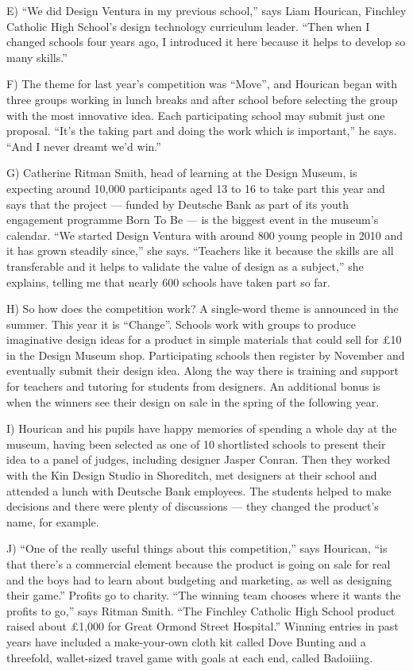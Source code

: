 \documentclass[UTF8,11pt]{ctexart}
\begin{document}
E) “We did Design Ventura in my previous school,” says Liam Hourican, Finchley Catholic High School’s design technology curriculum leader. “Then when I changed schools four years ago, I introduced it here because it helps to develop so many skills.”


F) The theme for last year’s competition was “Move”, and Hourican began with three groups working in lunch breaks and after school before selecting the group with the most innovative idea. Each participating school may submit just one proposal. “It’s the taking part and doing the work which is important,” he says. “And I never dreamt we’d win.”


G) Catherine Ritman Smith, head of learning at the Design Museum, is expecting around 10,000 participants aged 13 to 16 to take part this year and says that the project — funded by Deutsche Bank as part of its youth engagement programme Born To Be — is the biggest event in the museum’s calendar. “We started Design Ventura with around 800 young people in 2010 and it has grown steadily since,” she says. “Teachers like it because the skills are all transferable and it helps to validate the value of design as a subject,” she explains, telling me that nearly 600 schools have taken part so far.


H) So how does the competition work? A single-word theme is announced in the summer. This year it is “Change”. Schools work with groups to produce imaginative design ideas for a product in simple materials that could sell for £10 in the Design Museum shop. Participating schools then register by November and eventually submit their design idea. Along the way there is training and support for teachers and tutoring for students from designers. An additional bonus is when the winners see their design on sale in the spring of the following year.


I) Hourican and his pupils have happy memories of spending a whole day at the museum, having been selected as one of 10 shortlisted schools to present their idea to a panel of judges, including designer Jasper Conran. Then they worked with the Kin Design Studio in Shoreditch, met designers at their school and attended a lunch with Deutsche Bank employees. The students helped to make decisions and there were plenty of discussions — they changed the product’s name, for example.


J) “One of the really useful things about this competition,” says Hourican, “is that there’s a commercial element because the product is going on sale for real and the boys had to learn about budgeting and marketing, as well as designing their game.” Profits go to charity. “The winning team chooses where it wants the profits to go,” says Ritman Smith. “The Finchley Catholic High School product raised about £1,000 for Great Ormond Street Hospital.” Winning entries in past years have included a make-your-own cloth kit called Dove Bunting and a threefold, wallet-sized travel game with goals at each end, called Badoiiing.
\end{document}
